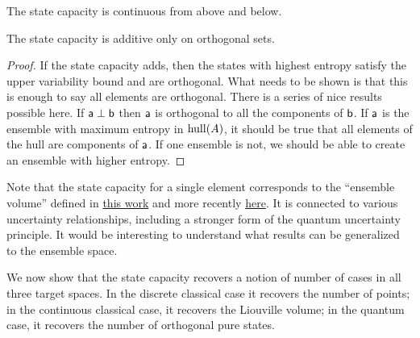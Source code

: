 \begin{mathSection}
\begin{conj}
	The state capacity is continuous from above and below.
\end{conj}

\begin{conj}
	The state capacity is additive only on orthogonal sets.
\end{conj}

\begin{proof}
	If the state capacity adds, then the states with highest entropy satisfy the upper variability bound and are orthogonal. What needs to be shown is that this is enough to say all elements are orthogonal. There is a series of nice results possible here. If $\ens[a] \ortho \ens[b]$ then $\ens[a]$ is orthogonal to all the components of $\ens[b]$. If $\ens[a]$ is the ensemble with maximum entropy in $\hull(A)$, it should be true that all elements of the hull are components of $\ens[a]$. If one ensemble is not, we should be able to create an ensemble with higher entropy.
\end{proof}
\end{mathSection}

Note that the state capacity for a single element corresponds to the ``ensemble volume'' defined in \href{https://arxiv.org/pdf/physics/9903045}{this work} and more recently \href{https://arxiv.org/pdf/1804.01343}{here}. It is connected to various uncertainty relationships, including a stronger form of the quantum uncertainty principle. It would be interesting to understand what results can be generalized to the ensemble space.

We now show that the state capacity recovers a notion of number of cases in all three target spaces. In the discrete classical case it recovers the number of points; in the continuous classical case, it recovers the Liouville volume; in the quantum case, it recovers the number of orthogonal pure states.

